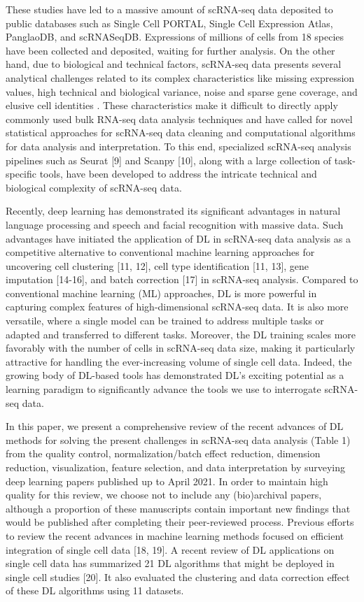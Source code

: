 \documentclass[
]{book}
\begin{document}
These studies have led to a massive amount of scRNA-seq data deposited to public databases such as Single Cell PORTAL, Single Cell Expression Atlas, PanglaoDB, and scRNASeqDB. Expressions of millions of cells from 18 species have been collected and deposited, waiting for further analysis. On the other hand, due to biological and technical factors, scRNA-seq data presents several analytical challenges related to its complex characteristics like missing expression values, high technical and biological variance, noise and sparse gene coverage, and elusive cell identities \citep{RN87}. These characteristics make it difficult to directly apply commonly used bulk RNA-seq data analysis techniques and have called for novel statistical approaches for scRNA-seq data cleaning and computational algorithms for data analysis and interpretation. To this end, specialized scRNA-seq analysis pipelines such as Seurat {[}9{]} and Scanpy {[}10{]}, along with a large collection of task-specific tools, have been developed to address the intricate technical and biological complexity of scRNA-seq data.

Recently, deep learning has demonstrated its significant advantages in natural language processing and speech and facial recognition with massive data. Such advantages have initiated the application of DL in scRNA-seq data analysis as a competitive alternative to conventional machine learning approaches for uncovering cell clustering {[}11, 12{]}, cell type identification {[}11, 13{]}, gene imputation {[}14-16{]}, and batch correction {[}17{]} in scRNA-seq analysis. Compared to conventional machine learning (ML) approaches, DL is more powerful in capturing complex features of high-dimensional scRNA-seq data. It is also more versatile, where a single model can be trained to address multiple tasks or adapted and transferred to different tasks. Moreover, the DL training scales more favorably with the number of cells in scRNA-seq data size, making it particularly attractive for handling the ever-increasing volume of single cell data. Indeed, the growing body of DL-based tools has demonstrated DL's exciting potential as a learning paradigm to significantly advance the tools we use to interrogate scRNA-seq data.

In this paper, we present a comprehensive review of the recent advances of DL methods for solving the present challenges in scRNA-seq data analysis (Table 1) from the quality control, normalization/batch effect reduction, dimension reduction, visualization, feature selection, and data interpretation by surveying deep learning papers published up to April 2021. In order to maintain high quality for this review, we choose not to include any (bio)archival papers, although a proportion of these manuscripts contain important new findings that would be published after completing their peer-reviewed process. Previous efforts to review the recent advances in machine learning methods focused on efficient integration of single cell data {[}18, 19{]}. A recent review of DL applications on single cell data has summarized 21 DL algorithms that might be deployed in single cell studies {[}20{]}. It also evaluated the clustering and data correction effect of these DL algorithms using 11 datasets.
\end{document}

